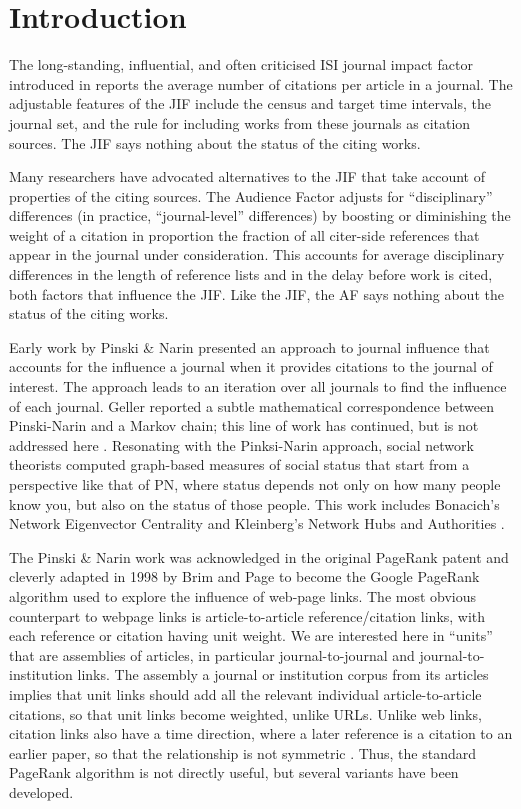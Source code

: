 \documentclass[10pt]{article}
\begin{document}
\section{Introduction}
The long-standing, influential, and often criticised ISI journal impact factor introduced in \cite{garfield1955} reports the average number of citations per article in a journal. The adjustable
features of the JIF include the census and target time intervals, the journal set, and the
rule for including works from these journals as citation sources. The JIF says nothing
about the status of the citing works.

Many researchers have advocated alternatives to the JIF that take account of properties of the citing sources. The Audience Factor \citep{zitt2008} adjusts for
“disciplinary” differences (in practice, “journal-level” differences) by boosting or diminishing the weight of a citation in proportion the fraction of all citer-side references
that appear in the journal under consideration. This accounts for average disciplinary
differences in the length of reference lists and in the delay before work is cited, both
factors that influence the JIF. Like the JIF, the AF says nothing about the status of
the citing works.

Early work by Pinski \& Narin \citep{pinski} presented an approach to journal influence
that accounts for the influence a journal when it provides citations
to the journal of interest. The approach leads to an iteration over all journals to find
the influence of each journal. Geller reported a subtle mathematical correspondence between
Pinski-Narin and a Markov chain; this line of work has continued, but is not addressed
here \citep{vigna}. Resonating with the Pinksi-Narin approach, social network theorists computed
graph-based measures of social status that start from a perspective like that of PN,
where status depends not only on how many people know you, but also on the status of
those people. This work includes Bonacich's Network Eigenvector Centrality \citep{bonacich} and Kleinberg's
Network Hubs and Authorities \citep{kleinberg}.

The Pinski \& Narin work was acknowledged in the original PageRank patent \citep{page1} and
cleverly adapted in 1998 by Brim and Page \citep{page} to become the Google PageRank algorithm
used to explore the influence of web-page links. The most obvious counterpart to webpage links is article-to-article reference/citation links, with each reference or citation
having unit weight. We are interested here in “units” that are assemblies of articles, in particular journal-to-journal and journal-to-institution links. The assembly a journal or institution corpus from its articles implies that unit links should add all the relevant individual article-to-article citations, so that unit links become weighted, unlike URLs. Unlike web links, citation links also have a time direction, where a later
reference is a citation to an earlier paper, so that the relationship is not symmetric \citep{wouters}. Thus, the standard PageRank algorithm is
not directly useful, but several variants have been developed.
\end{document}
